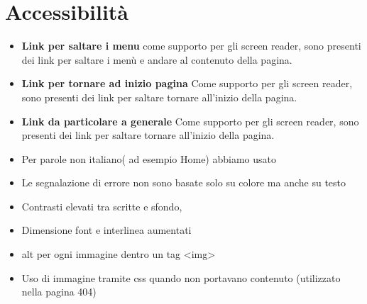 \documentclass[1_relazione.tex]{subfiles}
\begin{document}
\section{Accessibilit\`{a}}
\begin{itemize}
\item\textbf{Link per saltare i menu} come supporto per gli screen reader, sono presenti dei link per saltare i men\`{u} e andare al contenuto della pagina.

\item\textbf{Link per tornare ad inizio pagina} Come supporto per gli screen reader, sono presenti dei link per saltare tornare all'inizio della pagina.

\item\textbf{Link da particolare a generale} Come supporto per gli screen reader, sono presenti dei link per saltare tornare all'inizio della pagina.

\item Per parole non italiano( ad esempio Home) abbiamo usato 

\item Le segnalazione di errore non sono basate solo su colore ma anche su testo

\item Contrasti elevati tra scritte e sfondo, 

\item Dimensione font e interlinea aumentati 

\item alt per ogni immagine dentro un tag <img>

\item Uso di immagine tramite css quando non portavano contenuto (utilizzato nella pagina 404)

\end{itemize}
\end{document}
